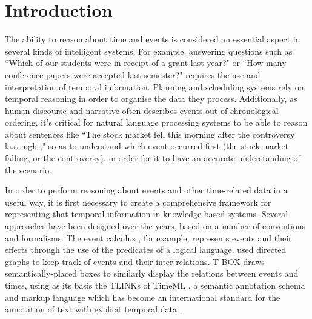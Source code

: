 \documentclass[a4paper,12pt,leqno]{article}
\begin{document}
\section{Introduction}\label{sec:intro}
The ability to reason about time and events is considered an essential aspect in several kinds of intelligent systems. For example, answering questions such as ``Which of our students were in receipt of a grant last year?" or ``How many conference papers were accepted last semester?" requires the use and interpretation of temporal information. Planning and scheduling systems rely on temporal reasoning in order to organise the data they process. Additionally, as human discourse and narrative often describes events out of chronological ordering, it's critical for natural language processing systems to be able to reason about sentences like ``The stock market fell this morning after the controversy last night," so as to understand which event occurred first (the stock market falling, or the controversy), in order for it to have an accurate understanding of the scenario.

In order to perform reasoning about events and other time-related data in a useful way, it is first necessary to create a comprehensive framework for representing that temporal information in knowledge-based systems. Several approaches have been designed over the years, based on a number of conventions and formalisms. The event calculus \citep{Kowalski1986,Miller1999,Mueller2008}, for example, represents events and their effects through the use of the predicates of a logical language. \citet{allen1983maintaining} used directed graphs to keep track of events and their inter-relations. T-BOX \citep{verhagen2005TBOX} draws semantically-placed boxes to similarly display the relations between events and times, using as its basis the TLINKs of TimeML \citep{timeml2005timeml}, a semantic annotation schema and markup language which has become an international standard \citep{ISO24617-1} for the annotation of text with explicit temporal data \citep{pustejovsky2010iso}.
\end{document}

